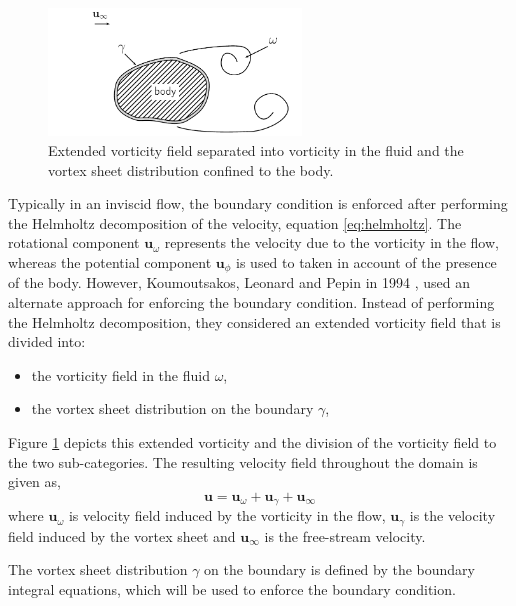 	\begin{figure}[!h]
	\centering
	\includegraphics[width=0.6\textwidth]{figures/lagrangian/noSlipVorticityField.pdf}
	\caption{Extended vorticity field separated into vorticity in the fluid and the vortex sheet distribution confined to the body.}
	\label{fig:noSlipVorticityField}
	\end{figure}

Typically in an inviscid flow, the boundary condition is enforced after performing the Helmholtz decomposition of the velocity, equation \ref{eq:helmholtz}. The rotational component $\mathbf{u}_{\omega}$ represents the velocity due to the vorticity in the flow, whereas the potential component $\mathbf{u}_{\phi}$ is used to taken in account of the presence of the body. However, Koumoutsakos, Leonard and Pepin in 1994 \cite{Koumoutsakos1994b}, used an alternate approach for enforcing the boundary condition. Instead of performing the Helmholtz decomposition, they considered an extended vorticity field that is divided into:
\begin{itemize}
\item the vorticity field in the fluid $\omega$,
\item the vortex sheet distribution on the boundary $\gamma$,
\end{itemize}
Figure \ref{fig:noSlipVorticityField} depicts this extended vorticity and the division of the vorticity field to the two sub-categories. The resulting velocity field throughout the domain is given as,
\begin{equation}
\mathbf{u} = \mathbf{u}_{\omega} + \mathbf{u}_{\gamma} + \mathbf{u}_{\infty}
\label{eq:la_noslipbcsimple}
\end{equation}
where $\mathbf{u}_{\omega}$ is velocity field induced by the vorticity in the flow, $\mathbf{u}_{\gamma}$ is the velocity field induced by the vortex sheet and $\mathbf{u}_{\infty}$ is the free-stream velocity.

The vortex sheet distribution $\gamma$ on the boundary is defined by the boundary integral equations, which will be used to enforce the boundary condition.

